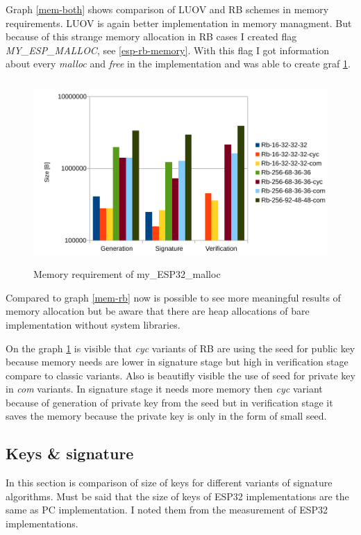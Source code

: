 \documentclass[thesis=M,english]{FITthesis}[2019/12/23]
\begin{document}
\noindent
Graph \ref{mem-both} shows comparison of LUOV and RB schemes in memory requirements. LUOV is again better implementation in memory managment. But because of this strange memory allocation in RB cases I created flag \textit{MY\_ESP\_MALLOC}, see \ref{esp-rb-memory}. With this flag I got information about every \textit{malloc} and \textit{free} in the implementation and was able to create graf \ref{mem-my-alloc}.

\begin{figure}[H]
\centering
\includegraphics[width=13cm,height=7cm]{images/mem-my_esp_malloc.pdf}
\caption{Memory requirement of my\_ESP32\_malloc}
\label{mem-my-alloc}
\end{figure}

\noindent
Compared to graph \ref{mem-rb} now is possible to see more meaningful results of memory allocation but be aware that there are heap allocations of bare implementation without system libraries.

\bigskip
\noindent
On the graph \ref{mem-my-alloc} is visible that \textit{cyc} variants of RB are using the seed for public key because memory needs are lower in signature stage but high in verification stage compare to classic variants. Also is beautifly visible the use of seed for private key in \textit{com} variants. In signature stage it needs more memory then \textit{cyc} variant because of generation of private key from the seed but in verification stage it saves the memory because the private key is only in the form of small seed.

\subsection{Keys \& signature} \label{key_sign}
In this section is comparison of size of keys for different variants of signature algorithms. Must be said that the size of keys of ESP32 implementations are the same as PC implementation. I noted them from the measurement of ESP32 implementations.
\end{document}
